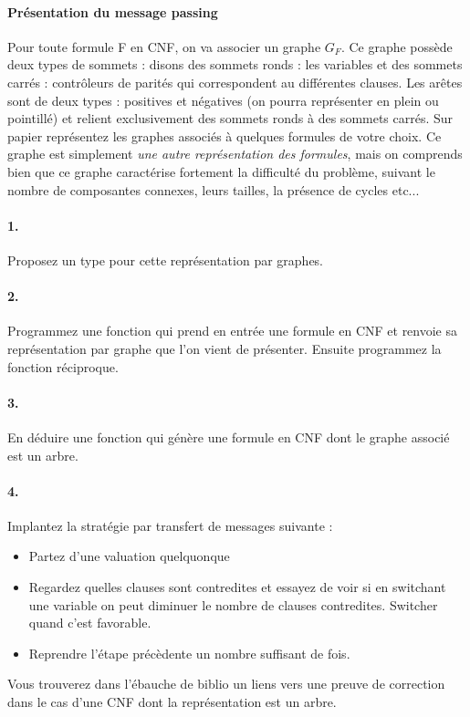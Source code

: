 \documentclass[10pt,a4paper]{article}
\begin{document}
\paragraph{Présentation du message passing} Pour toute formule F en CNF, on va associer un graphe $G_F$. Ce graphe possède deux types de sommets : disons des sommets ronds : les variables et des sommets carrés : contrôleurs de parités qui correspondent au différentes clauses. Les arêtes sont de deux types : positives et négatives (on pourra représenter en plein ou pointillé) et relient exclusivement des sommets ronds à des sommets carrés. Sur papier représentez les graphes associés à quelques formules de votre choix. Ce graphe est simplement \emph{une autre représentation des formules}, mais on comprends bien que ce graphe caractérise fortement la difficulté du problème, suivant le nombre de composantes connexes, leurs tailles, la présence de cycles etc... 

\paragraph{1.} Proposez un type pour cette représentation par graphes.

\paragraph{2.} Programmez une fonction qui prend en entrée une formule en CNF et renvoie sa représentation par graphe que l'on vient de présenter. Ensuite programmez la fonction réciproque. 

\paragraph{3.} En déduire une fonction qui génère une formule en CNF dont le graphe associé est un arbre.

\paragraph{4.} Implantez la stratégie par transfert de messages suivante : 
\begin{itemize}
\item Partez d'une valuation quelquonque
\item Regardez quelles clauses sont contredites et essayez de voir si en switchant une variable on peut diminuer le nombre de clauses contredites. Switcher quand c'est favorable.
\item Reprendre l'étape précèdente un nombre suffisant de fois. 
\end{itemize}
Vous trouverez dans l'ébauche de biblio un liens vers une preuve de correction dans le cas d'une CNF dont la représentation est un arbre.
\end{document}
